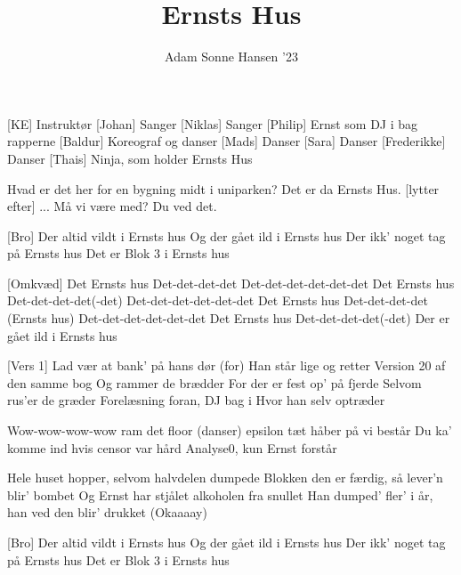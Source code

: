 \documentclass[a4paper,11pt]{article}
\title{Ernsts Hus}
\author{Adam Sonne Hansen ’23}
\begin{document}
\maketitle

\begin{roles}
[KE] Instruktør
[Johan] Sanger
[Niklas] Sanger
[Philip] Ernst som DJ i bag rapperne
[Baldur] Koreograf og danser
[Mads] Danser
[Sara] Danser
[Frederikke] Danser
[Thais] Ninja, som holder Ernsts Hus
\end{roles}

\begin{song}

 Hvad er det her for en bygning midt i uniparken? 
 Det er da Ernsts Hus.
 [lytter efter] ... Må vi være med?
 Du ved det.

[Bro] Der altid vildt i Ernsts hus
 Og der gået ild i Ernsts hus
 Der ikk’ noget tag på Ernsts hus
Det er Blok 3 i Ernsts hus

[Omkvæd] Det Ernsts hus
Det-det-det-det
Det-det-det-det-det-det
Det Ernsts hus
Det-det-det-det(-det)
Det-det-det-det-det-det
Det Ernsts hus
Det-det-det-det (Ernsts hus)
Det-det-det-det-det-det
Det Ernsts hus
Det-det-det-det(-det)
Der er gået ild i Ernsts hus

[Vers 1] Lad vær at bank’ på hans dør
(for) Han står lige og retter
Version 20 af den samme bog
Og rammer de brædder
For der er fest op’ på fjerde
Selvom rus’er de græder
Forelæsning foran, DJ bag i
Hvor han selv optræder


 Wow-wow-wow-wow ram det floor
(danser) epsilon tæt håber på vi består
Du ka’ komme ind hvis censor var hård
Analyse0, kun Ernst forstår

 Hele huset hopper, selvom halvdelen dumpede
Blokken den er færdig, så lever’n blir’ bombet
Og Ernst har stjålet alkoholen fra snullet
Han dumped’ fler’ i år, han ved den blir’ drukket (Okaaaay)

[Bro] Der altid vildt i Ernsts hus
 Og der gået ild i Ernsts hus
 Der ikk’ noget tag på Ernsts hus
Det er Blok 3 i Ernsts hus


\end{song}
\end{document}
